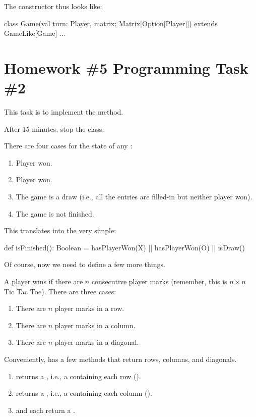 \documentclass{book}
\begin{document}
The  constructor thus looks like:

\begin{scalacode}
  class Game(val turn: Player, matrix: Matrix[Option[Player]]) extends GameLike[Game] { ... }
\end{scalacode}

\section{Homework \#5 Programming Task \#2}

This task is to implement the  method.

After 15 minutes, stop the class.

There are four cases for the state of any :

\begin{enumerate}
  \item Player  won.
  \item Player  won.
  \item The game is a draw (i.e., all the entries are filled-in but neither player won).
  \item The game is not finished.
\end{enumerate}

This translates into the very simple:

\begin{scalacode}
  def isFinished(): Boolean = {
    hasPlayerWon(X) || hasPlayerWon(O) || isDraw()
  }
\end{scalacode}

Of course, now we need to define a few more things.

A player wins if there are $n$ consecutive player marks (remember, this is $n \times n$ Tic Tac Toe).  There are three cases:

\begin{enumerate}
  \item There are $n$ player marks in a row.
  \item There are $n$ player marks in a column.
  \item There are $n$ player marks in a diagonal.
\end{enumerate}

Conveniently,  has a few methods that return rows, columns, and diagonals.

\begin{enumerate}
  \item {} returns a , i.e., a  containing each row ().
  \item {} returns a , i.e., a  containing each column ().
  \item {} and  each return a .
\end{enumerate}
\end{document}
